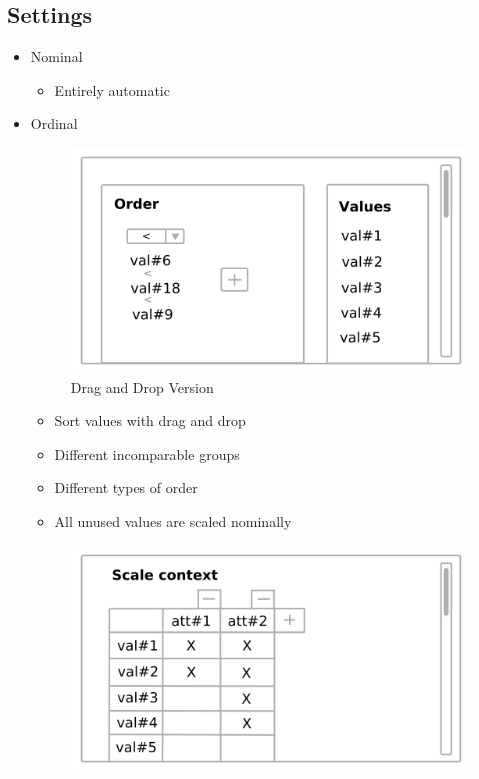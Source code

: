 \documentclass[]{article}
\begin{document}
\subsection{Settings}
\begin{itemize}
	\item Nominal
		\begin{itemize}
		\item Entirely automatic
		\end{itemize}	    
	\item Ordinal
		\begin{figure}[H]
			\includegraphics[width=\linewidth]{ord-2.png}
			\caption{Drag and Drop Version}
			\label{fig:o1}
		\end{figure}
		\begin{itemize}
			\item Sort values with drag and drop
			\item Different incomparable groups
			\item Different types of order
			\item All unused values are scaled nominally 
		\end{itemize}
		\begin{figure}[H]
			\includegraphics[width=\linewidth]{ord-1.png}

\end{figure}
\end{itemize}
\end{document}
